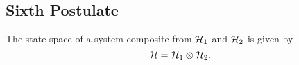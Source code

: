         \subsection{Sixth Postulate}
        \begin{postulate}
            The state space of a system composite from $\mathcal{H}_1$ and $\mathcal{H}_2$ is given by
            \begin{equation*}
                \mathcal{H}=\mathcal{H}_1\otimes\mathcal{H}_2.
            \end{equation*}
        \end{postulate}
